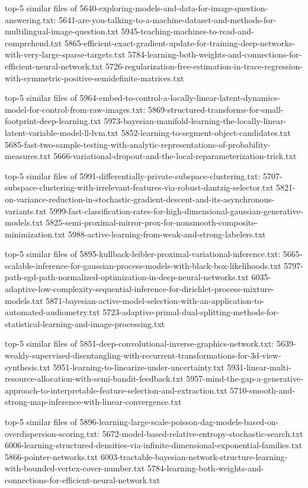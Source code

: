 \documentclass[11pt]{article}
\begin{document}
top-5 similar files of
5640-exploring-models-and-data-for-image-question-answering.txt:
5641-are-you-talking-to-a-machine-dataset-and-methods-for-multilingual-image-question.txt
5945-teaching-machines-to-read-and-comprehend.txt
5865-efficient-exact-gradient-update-for-training-deep-networks-with-very-large-sparse-targets.txt
5784-learning-both-weights-and-connections-for-efficient-neural-network.txt
5726-regularization-free-estimation-in-trace-regression-with-symmetric-positive-semidefinite-matrices.txt

top-5 similar files of
5964-embed-to-control-a-locally-linear-latent-dynamics-model-for-control-from-raw-images.txt:
5869-structured-transforms-for-small-footprint-deep-learning.txt
5973-bayesian-manifold-learning-the-locally-linear-latent-variable-model-ll-lvm.txt
5852-learning-to-segment-object-candidates.txt
5685-fast-two-sample-testing-with-analytic-representations-of-probability-measures.txt
5666-variational-dropout-and-the-local-reparameterization-trick.txt

top-5 similar files of
5991-differentially-private-subspace-clustering.txt:
5707-subspace-clustering-with-irrelevant-features-via-robust-dantzig-selector.txt
5821-on-variance-reduction-in-stochastic-gradient-descent-and-its-asynchronous-variants.txt
5999-fast-classification-rates-for-high-dimensional-gaussian-generative-models.txt
5825-semi-proximal-mirror-prox-for-nonsmooth-composite-minimization.txt
5988-active-learning-from-weak-and-strong-labelers.txt

top-5 similar files of
5895-kullback-leibler-proximal-variational-inference.txt:
5665-scalable-inference-for-gaussian-process-models-with-black-box-likelihoods.txt
5797-path-sgd-path-normalized-optimization-in-deep-neural-networks.txt
6035-adaptive-low-complexity-sequential-inference-for-dirichlet-process-mixture-models.txt
5871-bayesian-active-model-selection-with-an-application-to-automated-audiometry.txt
5723-adaptive-primal-dual-splitting-methods-for-statistical-learning-and-image-processing.txt

top-5 similar files of
5851-deep-convolutional-inverse-graphics-network.txt:
5639-weakly-supervised-disentangling-with-recurrent-transformations-for-3d-view-synthesis.txt
5951-learning-to-linearize-under-uncertainty.txt
5931-linear-multi-resource-allocation-with-semi-bandit-feedback.txt
5957-mind-the-gap-a-generative-approach-to-interpretable-feature-selection-and-extraction.txt
5710-smooth-and-strong-map-inference-with-linear-convergence.txt

top-5 similar files of
5896-learning-large-scale-poisson-dag-models-based-on-overdispersion-scoring.txt:
5672-model-based-relative-entropy-stochastic-search.txt
6006-learning-structured-densities-via-infinite-dimensional-exponential-families.txt
5866-pointer-networks.txt
6003-tractable-bayesian-network-structure-learning-with-bounded-vertex-cover-number.txt
5784-learning-both-weights-and-connections-for-efficient-neural-network.txt
\end{document}
